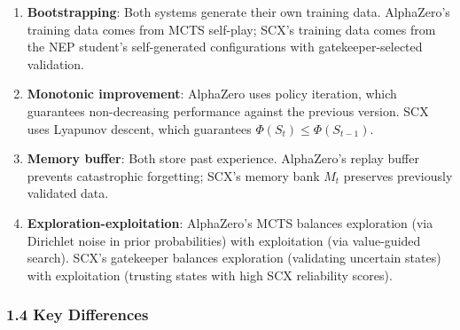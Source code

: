 \documentclass[
  12pt,
]{article}
\begin{document}
\begin{enumerate}
\def\labelenumi{\arabic{enumi}.}
\item
  \textbf{Bootstrapping}: Both systems generate their own training data.
  AlphaZero's training data comes from MCTS self-play; SCX's training
  data comes from the NEP student's self-generated configurations with
  gatekeeper-selected validation.
\item
  \textbf{Monotonic improvement}: AlphaZero uses policy iteration, which
  guarantees non-decreasing performance against the previous version.
  SCX uses Lyapunov descent, which guarantees
  \(\Phi(S_t) \leq \Phi(S_{t-1})\).
\item
  \textbf{Memory buffer}: Both store past experience. AlphaZero's replay
  buffer prevents catastrophic forgetting; SCX's memory bank \(M_t\)
  preserves previously validated data.
\item
  \textbf{Exploration-exploitation}: AlphaZero's MCTS balances
  exploration (via Dirichlet noise in prior probabilities) with
  exploitation (via value-guided search). SCX's gatekeeper balances
  exploration (validating uncertain states) with exploitation (trusting
  states with high SCX reliability scores).
\end{enumerate}

\subsubsection{1.4 Key Differences}\label{key-differences}
\end{document}
